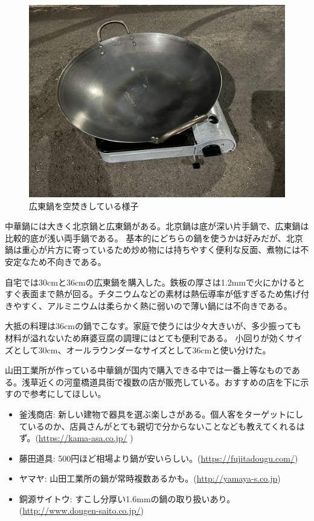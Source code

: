 \documentclass[a4paper,10pt,xelatex,ja=standard,twocolumn]{bxjsarticle}
\begin{document}
\begin{figure}[h]
  \caption{広東鍋を空焚きしている様子}
  \label{nabe1}
  \begin{center}
    \includegraphics[width=\linewidth]{IMG_3828.jpg}
  \end{center}
\end{figure}

中華鍋には大きく北京鍋と広東鍋がある。北京鍋は底が深い片手鍋で、広東鍋は比較的底が浅い両手鍋である。
基本的にどちらの鍋を使うかは好みだが、北京鍋は重心が片方に寄っているため炒め物には持ちやすく便利な反面、煮物には不安定なため不向きである。

自宅では30cmと36cmの広東鍋を購入した。鉄板の厚さは1.2mmで火にかけるとすぐ表面まで熱が回る。チタニウムなどの素材は熱伝導率が低すぎるため焦げ付きやすく、アルミニウムは柔らかく熱に弱いので薄い鍋には不向きである。

大抵の料理は36cmの鍋でこなす。家庭で使うには少々大きいが、多少振っても材料が溢れないため麻婆豆腐の調理にはとても便利である。
小回りが効くサイズとして30cm、オールラウンダーなサイズとして36cmと使い分けた。

山田工業所が作っている中華鍋が国内で購入できる中では一番上等なものである。浅草近くの河童橋道具街で複数の店が販売している。おすすめの店を下に示すので参考にしてほしい。

\begin{itemize}
  \item 釜浅商店: 新しい建物で器具を選ぶ楽しさがある。個人客をターゲットにしているのか、店員さんがとても親切で分からないことなども教えてくれるはず。(\url{https://kama-asa.co.jp/} )
  \item 藤田道具: 500円ほど相場より鍋が安いらしい。(\url{https://fujitadougu.com/})
  \item ヤマヤ: 山田工業所の鍋が常時複数あるかも。(\url{http://yamaya-s.co.jp})
  \item 銅源サイトウ: すこし分厚い1.6mmの鍋の取り扱いあり。(\url{http://www.dougen-saito.co.jp/})
\end{itemize}
\end{document}
